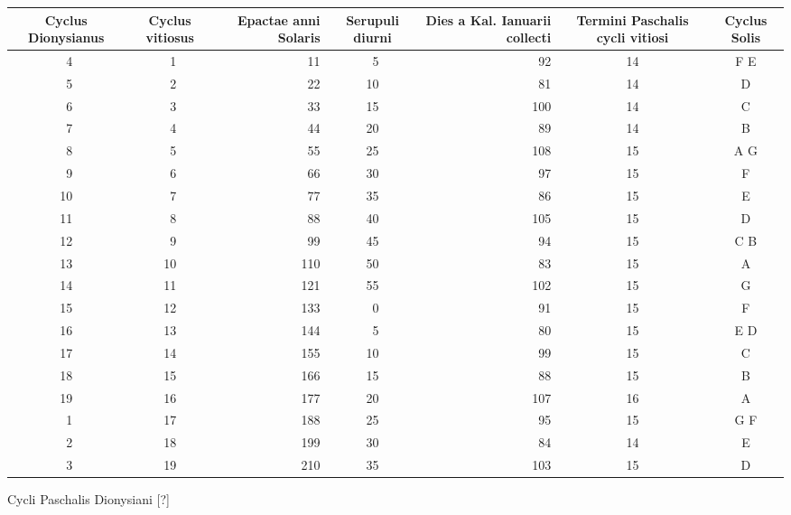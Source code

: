 %
\begin{tabnums} %
\normalsize
\centering
\newcommand{\hts}{\scriptsize}
\newcommand{\cwd}{4em}
%
\newcommand{\da}{\scriptsize{†}}
\begin{tabular}{@{} c c r c r c c @{}}
\toprule
  \hts{\parbox[b]{\cwd}{\raggedright Cy\-clus Dio\-ny\-si\-an\-us}} &
  \hts{\parbox[b]{\cwd}{\raggedright Cy\-clus vi\-ti\-o\-sus}} &
  \hts{\parbox[b]{\cwd}{\raggedright E\-pac\-tae an\-ni So\-la\-ris}} &
  \hts{\parbox[b]{\cwd}{\raggedright Seru\-pu\-li di\-ur\-ni}} &
  \hts{\parbox[b]{\cwd}
    {\raggedright Di\-es a Kal. Ia\-nu\-a\-rii col\-lec\-ti}} &
  \hts{\parbox[b]{\cwd}
    {\raggedright Ter\-mi\-ni Pas\-cha\-lis cy\-cli vi\-ti\-o\-si}} &
  \hts{\parbox[b]{\cwd}{\raggedright Cy\-clus So\-lis}}
\\
\midrule
 ~4 & ~1 &  11 & ~5 &  92 & 14 & F E \\
 ~5 & ~2 &  22 & 10 &  81 & 14 &  D  \\
 ~6 & ~3 &  33 & 15 & 100 & 14 &  C  \\
 ~7 & ~4 &  44 & 20 &  89 & 14 &  B  \\
 ~8 & ~5 &  55 & 25 & 108 & 15 & A G \\
 ~9 & ~6 &  66 & 30 &  97 & 15 &  F  \\
 10 & ~7 &  77 & 35 &  86 & 15 &  E  \\
 11 & ~8 &  88 & 40 & 105 & 15 &  D  \\
 12 & ~9 &  99 & 45 &  94 & 15 & C B \\
 13 & 10 & 110 & 50 &  83 & 15 &  A  \\
 14 & 11 & 121 & 55 & 102 & 15 &  G  \\
 15 & 12 & 133 & ~0 &  91 & 15 &  F  \\
 16 & 13 & 144 & ~5 &  80 & 15 & E D \\
 17 & 14 & 155 & 10 &  99 & 15 &  C  \\
 18 & 15 & 166 & 15 &  88 & 15 &  B  \\
 19 & 16 & 177 & 20 & 107 & 16 &  A  \\
 ~1 & 17 & 188 & 25 &  95 & 15 & G F  \\
 ~2 & 18 & 199 & 30 &  84 & 14 &  E  \\
 ~3 & 19 & 210 & 35 & 103 & 15 &  D  \\
\bottomrule
\end{tabular}
%
\caption{Cycli Paschalis Dionysiani [?]}
\label{tab:p164}
%
\end{tabnums}
